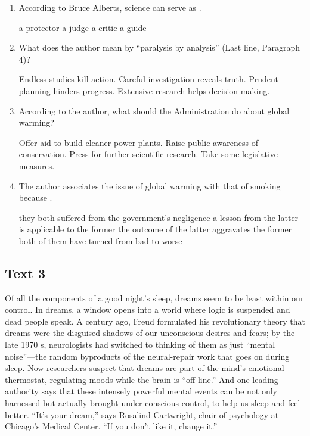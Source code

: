 {\begin{enumerate}[resume]
\fourchoices
{there was no scientific evidence of the correlation between smoking and death}
{the number of early deaths of smokers in the past decades was insignificant}
{people had the freedom to choose their own way of life}
{antismoking people were usually talking nonsense}


\item
According to Bruce Alberts, science can serve as \lineread.



\fourchoices
{a protector}
{a judge}
{a critic}
{a guide}




\item
What does the author mean by ``paralysis by analysis'' (Last
line, Paragraph 4)?


\fourchoices
{Endless studies kill action.}
{Careful investigation reveals truth.}
{Prudent planning hinders progress.}
{Extensive research helps decision-making.}


\item
According to the author, what should the Administration do
about global warming?


\fourchoices
{Offer aid to build cleaner power plants.}
{Raise public awareness of conservation.}
{Press for further scientific research.}
{Take some legislative measures.}


\item
 The author associates the issue of global warming with that
of smoking because \lineread.


\fourchoices
{they both suffered from the government's negligence}
{a lesson from the latter is applicable to the former}
{the outcome of the latter aggravates the former}
{both of them have turned from bad to worse}


\end{enumerate}



\newpage
\subsection{Text 3}


Of all the components of a good night's sleep, dreams seem to be least
within our control. In dreams, a window opens into a world where logic
is suspended and dead people speak. A century ago, Freud formulated his
revolutionary theory that dreams were the disguised shadows of our
unconscious desires and fears; by the late 1970 s, neurologists had
switched to thinking of them as just ``mental noise''---the random
byproducts of the neural-repair work that goes on during sleep. Now
researchers suspect that dreams are part of the mind's emotional
thermostat, regulating moods while the brain is ``off-line.'' And one
leading authority says that these intensely powerful mental events can
be not only harnessed but actually brought under conscious control, to
help us sleep and feel better. ``It's your dream,'' says Rosalind
Cartwright, chair of psychology at Chicago's Medical Center. ``If you
don't like it, change it.''

}
